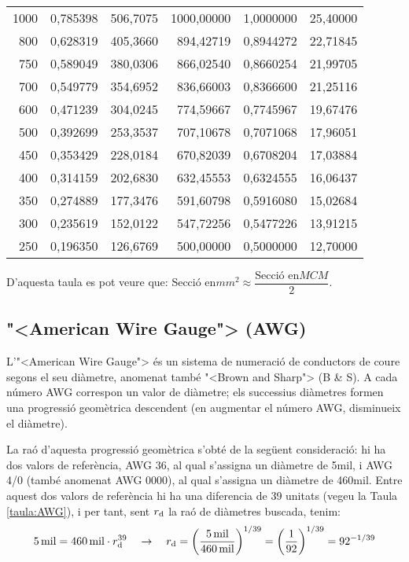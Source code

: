 \begin{longtable}{r<{\hspace{0.6em}}rrrrr}
1000 &   0,785398 &   506,7075 & 1000,00000 &  1,0000000 &   25,40000 \\
 800 &   0,628319 &   405,3660 &  894,42719 &  0,8944272 &   22,71845 \\
 750 &   0,589049 &   380,0306 &  866,02540 &  0,8660254 &   21,99705 \\
 700 &   0,549779 &   354,6952 &  836,66003 &  0,8366600 &   21,25116 \\
 600 &   0,471239 &   304,0245 &  774,59667 &  0,7745967 &   19,67476 \\
 500 &   0,392699 &   253,3537 &  707,10678 &  0,7071068 &   17,96051 \\
 450 &   0,353429 &   228,0184 &  670,82039 &  0,6708204 &   17,03884 \\
 400 &   0,314159 &   202,6830 &  632,45553 &  0,6324555 &   16,06437 \\
 350 &   0,274889 &   177,3476 &  591,60798 &  0,5916080 &   15,02684 \\
 300 &   0,235619 &   152,0122 &  547,72256 &  0,5477226 &   13,91215 \\
 250 &   0,196350 &   126,6769 &  500,00000 &  0,5000000 &   12,70000 \\
\bottomrule[1pt]
\end{longtable}

D'aquesta taula es pot veure que: $\text{Secci\'{o} en}\unit{mm^2} \approx \dfrac{\text{Secci\'{o} en}\unit{MCM}}{2}$.

\subsection{{"<}American Wire Gauge{">} (AWG)}

L'{"<}American Wire Gauge{">} \'{e}s un sistema de numeraci\'{o} de conductors de coure segons el seu di\`{a}metre, anomenat tamb\'{e} {"<}Brown and Sharp{">} (B \& S). A cada n\'{u}mero AWG correspon un valor de di\`{a}metre; els successius di\`{a}metres formen una progressi\'{o} geom\`{e}trica descendent (en augmentar el n\'{u}mero AWG, disminueix el di\`{a}metre).

La ra\'{o} d'aquesta progressi\'{o} geom\`{e}trica s'obt\'{e} de la seg\"{u}ent consideraci\'{o}: hi ha dos valors de refer\`{e}ncia, AWG 36, al qual s'assigna un di\`{a}metre de 5\unit{mil}, i AWG 4/0 (tamb\'{e} anomenat AWG 0000), al qual s'assigna un di\`{a}metre de 460\unit{mil}. Entre aquest dos valors de refer\`{e}ncia hi ha una diferencia de 39 unitats (vegeu la Taula \vref{taula:AWG}), i per tant, sent $r_\mathrm{d}$ la ra\'{o} de di\`{a}metres buscada, tenim:
\begin{equation}
   5\mathrm{\,mil} = 460\mathrm{\,mil} \cdot r_\mathrm{d}^{39} \quad \rightarrow \quad r_\mathrm{d} = \left( \frac{5\mathrm{\,mil}}{460\mathrm{\,mil}} \right)^{1/39} = \left( \frac{1}{92} \right)^{1/39} = 92^{-1/39}
\end{equation}

